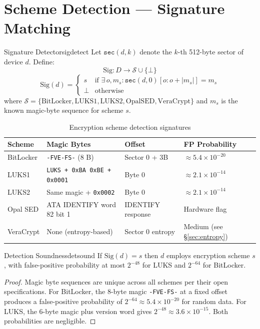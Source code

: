 \documentclass[11pt,a4paper]{report}
\newcommand{\calS}{\mathcal{S}}
\begin{document}
\section{Scheme Detection --- Signature Matching}

\begin{definition}{Signature Detector}{sigdetect}
Let $\mathtt{sec}(d, k)$ denote the $k$-th 512-byte sector of device $d$. Define:
\[
  \mathrm{Sig}: D \to \calS \cup \{\bot\}
\]
\[
  \mathrm{Sig}(d) = \begin{cases}
    s & \text{if } \exists\, o, m_s : \mathtt{sec}(d,0)[o : o + |m_s|] = m_s \\
    \bot & \text{otherwise}
  \end{cases}
\]
where $\calS = \{\text{BitLocker}, \text{LUKS1}, \text{LUKS2}, \text{OpalSED}, \text{VeraCrypt}\}$ and $m_s$ is the known magic-byte sequence for scheme $s$.
\end{definition}

\begin{table}[htbp]
\centering
\caption{Encryption scheme detection signatures}
\label{tab:signatures}
\begin{tabular}{@{}llll@{}}
\toprule
\textbf{Scheme} & \textbf{Magic Bytes} & \textbf{Offset} & \textbf{FP Probability} \\
\midrule
BitLocker  & \texttt{-FVE-FS-} (8 B)   & Sector 0 + 3B & $\approx 5.4 \times 10^{-20}$ \\
LUKS1      & \texttt{LUKS + 0xBA 0xBE + 0x0001} & Byte 0 & $\approx 2.1 \times 10^{-14}$ \\
LUKS2      & Same magic + \texttt{0x0002}       & Byte 0 & $\approx 2.1 \times 10^{-14}$ \\
Opal SED   & ATA IDENTIFY word 82 bit 1         & IDENTIFY response & Hardware flag \\
VeraCrypt  & None (entropy-based)               & Sector 0 entropy & Medium (see \S\ref{sec:entropy}) \\
\bottomrule
\end{tabular}
\end{table}

\begin{theorem}{Detection Soundness}{detsound}
If $\mathrm{Sig}(d) = s$ then $d$ employs encryption scheme $s$, with false-positive probability at most $2^{-48}$ for LUKS and $2^{-64}$ for BitLocker.
\end{theorem}

\begin{proof}
Magic byte sequences are unique across all schemes per their open specifications. For BitLocker, the 8-byte magic \texttt{-FVE-FS-} at a fixed offset produces a false-positive probability of $2^{-64} \approx 5.4 \times 10^{-20}$ for random data. For LUKS, the 6-byte magic plus version word gives $2^{-48} \approx 3.6 \times 10^{-15}$. Both probabilities are negligible.
\end{proof}
\end{document}
